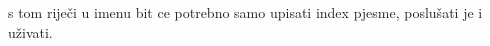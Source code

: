 \documentclass{exam}
\begin{document}
                                                                                                                                s
                                                                                                                                tom
                                                                                                                                riječi
                                                                                                                                u
                                                                                                                                imenu
                                                                                                                                bit
                                                                                                                                ce
                                                                                                                                potrebno
                                                                                                                                samo
                                                                                                                                upisati
                                                                                                                                index
                                                                                                                                pjesme,
                                                                                                                                poslušati
                                                                                                                                je
                                                                                                                                i
                                                                                                                                uživati.
\end{document}
